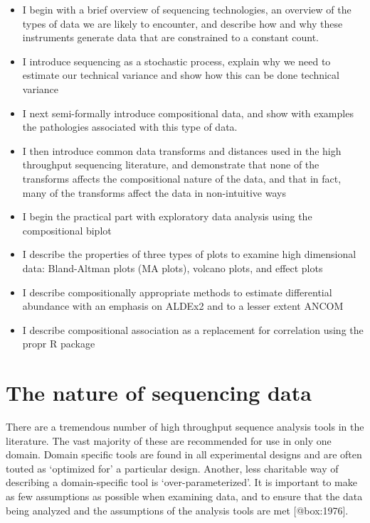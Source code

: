 \documentclass[
  onecolumn]{article}
\providecommand{\tightlist}{%
  \setlength{\itemsep}{0pt}\setlength{\parskip}{0pt}}
\begin{document}
\begin{itemize}
\tightlist
\item
  I begin with a brief overview of sequencing technologies, an overview of the types of data we are likely to encounter, and describe how and why these instruments generate data that are constrained to a constant count.
\item
  I introduce sequencing as a stochastic process, explain why we need to estimate our technical variance and show how this can be done technical variance
\item
  I next semi-formally introduce compositional data, and show with examples the pathologies associated with this type of data.
\item
  I then introduce common data transforms and distances used in the high throughput sequencing literature, and demonstrate that none of the transforms affects the compositional nature of the data, and that in fact, many of the transforms affect the data in non-intuitive ways
\item
  I begin the practical part with exploratory data analysis using the compositional biplot
\item
  I describe the properties of three types of plots to examine high dimensional data: Bland-Altman plots (MA plots), volcano plots, and effect plots
\item
  I describe compositionally appropriate methods to estimate differential abundance with an emphasis on ALDEx2 and to a lesser extent ANCOM
\item
  I describe compositional association as a replacement for correlation using the propr R package
\end{itemize}

\clearpage

\hypertarget{sequencing}{%
\section{The nature of sequencing data}\label{sequencing}}

There are a tremendous number of high throughput sequence analysis tools in the literature. The vast majority of these are recommended for use in only one domain. Domain specific tools are found in all experimental designs and are often touted as `optimized for' a particular design. Another, less charitable way of describing a domain-specific tool is `over-parameterized'. It is important to make as few assumptions as possible when examining data, and to ensure that the data being analyzed and the assumptions of the analysis tools are met {[}@box:1976{]}.
\end{document}
